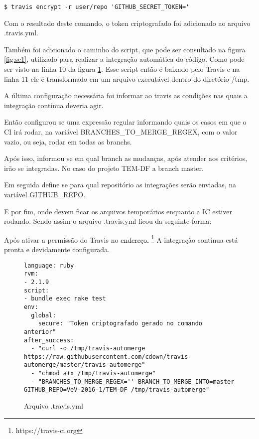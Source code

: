 \begin{lstlisting}
$ travis encrypt -r user/repo 'GITHUB_SECRET_TOKEN='
\end{lstlisting}

Com o resultado deste comando, o token criptografado foi adicionado ao arquivo .travis.yml.

Também foi adicionado o caminho do script, que pode ser consultado na figura \ref{fig:sc1}, utilizado para realizar a integração automática do código. Como pode ser visto na linha 10 da figura \ref{fig:yml}. Esse script então é baixado pelo Travis e na linha 11 ele é transformado em um arquivo executável dentro do diretório /tmp.

A última configuração necessária foi informar ao travis as condições nas quais a integração contínua deveria agir.

Então configurou se uma expressão regular informando quais os casos em que o CI irá rodar, na variável BRANCHES\_TO\_MERGE\_REGEX, com o valor vazio, ou seja, rodar em todas as branchs.

Após isso, informou se em qual branch as mudanças, após atender aos critérios, irão se integradas. No caso do projeto TEM-DF a branch master.

Em seguida define se para qual repositório as integrações serão enviadas, na variável GITHUB\_REPO.

E por fim, onde devem ficar os arquivos temporários enquanto a IC estiver rodando. Sendo assim o arquivo .travis.yml ficou da seguinte forma:

Após ativar a permissão do Travis no \href{https://travis-ci.org}{endereço.}%
\footnote{https://travis-ci.org}
A integração contínua está pronta e devidamente configurada.

\begin{figure}[!ht]
  \caption{Arquivo .travis.yml}
  \label{fig:yml}

\begin{lstlisting}
language: ruby
rvm:
- 2.1.9
script:
- bundle exec rake test
env:
  global:
    secure: "Token criptografado gerado no comando anterior"
after_success:
  - "curl -o /tmp/travis-automerge https://raw.githubusercontent.com/cdown/travis-automerge/master/travis-automerge"
  - "chmod a+x /tmp/travis-automerge"
  - "BRANCHES_TO_MERGE_REGEX='' BRANCH_TO_MERGE_INTO=master GITHUB_REPO=VeV-2016-1/TEM-DF /tmp/travis-automerge"
\end{lstlisting}
\end{figure}



